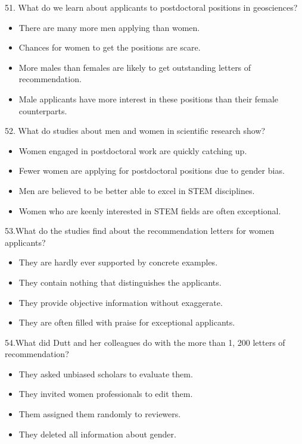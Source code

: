 \documentclass[UTF8,11pt]{ctexart}
\begin{document}
51. What do we learn about applicants to postdoctoral positions in geosciences?


\begin{itemize}[leftmargin=2em,itemsep=.2em,topsep=.4em]\item[A.] There are many more men applying than women.
\item[B.] Chances for women to get the positions are scare.
\item[C.] More males than females are likely to get outstanding letters of recommendation.
\item[D.] Male applicants have more interest in these positions than their female counterparts.
\end{itemize}

52. What do studies about men and women in scientific research show?


\begin{itemize}[leftmargin=2em,itemsep=.2em,topsep=.4em]\item[A.] Women engaged in postdoctoral work are quickly catching up.
\item[B.] Fewer women are applying for postdoctoral positions due to gender bias.
\item[C.] Men are believed to be better able to excel in STEM disciplines.
\item[D.] Women who are keenly interested in STEM fields are often exceptional.
\end{itemize}

53.What do the studies find about the recommendation letters for women applicants?


\begin{itemize}[leftmargin=2em,itemsep=.2em,topsep=.4em]\item[A.] They are hardly ever supported by concrete examples.
\item[B.] They contain nothing that distinguishes the applicants.
\item[C.] They provide objective information without exaggerate.
\item[D.] They are often filled with praise for exceptional applicants.
\end{itemize}

54.What did Dutt and her colleagues do with the more than 1, 200 letters of recommendation?


\begin{itemize}[leftmargin=2em,itemsep=.2em,topsep=.4em]\item[A.] They asked unbiased scholars to evaluate them.
\item[B.] They invited women professionals to edit them.
\item[C.] Them assigned them randomly to reviewers.
\item[D.] They deleted all information about gender.
\end{itemize}
\end{document}
